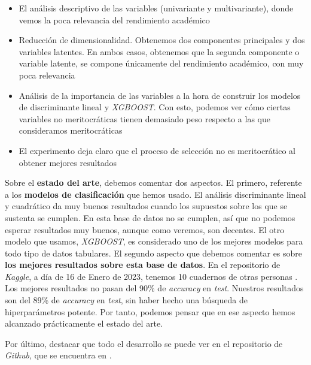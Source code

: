 \begin{itemize}
    \item El análisis descriptivo de las variables (univariante y multivariante), donde vemos la poca relevancia del rendimiento académico
    \item Reducción de dimensionalidad. Obtenemos dos componentes principales y dos variables latentes. En ambos casos, obtenemos que la segunda componente o variable latente, se compone únicamente del rendimiento académico, con muy poca relevancia
    \item Análisis de la importancia de las variables a la hora de construir los modelos de discriminante lineal y \textit{XGBOOST}. Con esto, podemos ver cómo ciertas variables no meritocráticas tienen demasiado peso respecto a las que consideramos meritocráticas
    \item El experimento deja claro que el proceso de selección no es meritocrático al obtener mejores resultados
\end{itemize}

Sobre el \textbf{estado del arte}, debemos comentar dos aspectos. El primero, referente a los \textbf{modelos de clasificación} que hemos usado. El análisis discriminante lineal y cuadrático da muy buenos resultados cuando los supuestos sobre los que se sustenta se cumplen. En esta base de datos no se cumplen, así que no podemos esperar resultados muy buenos, aunque como veremos, son decentes. El otro modelo que usamos, \textit{XGBOOST}, es considerado uno de los mejores modelos para todo tipo de datos tabulares. El segundo aspecto que debemos comentar es sobre \textbf{los mejores resultados sobre esta base de datos}. En el repositorio de \textit{Kaggle}, a día de 16 de Enero de 2023, tenemos 10 cuadernos de otras personas \footnotemark. Los mejores resultados no pasan del 90\% de \textit{accuracy} en \textit{test}. Nuestros resultados son del 89\% de \textit{accuracy} en \textit{test}, sin haber hecho una búsqueda de hiperparámetros potente. Por tanto, podemos pensar que en ese aspecto hemos alcanzado prácticamente el estado del arte.


Por último, destacar que todo el desarrollo se puede ver en el repositorio de \textit{Github}, que se encuentra en \cite{repo_github:online}.
